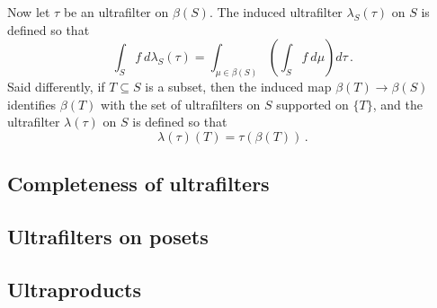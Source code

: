 \begin{construction}
	Now let $ \tau $ be an ultrafilter on $ \beta(S) $.
	The induced ultrafilter $ \lambda_S(\tau) $ on $ S $
	is defined so that
	\[
		\int_{S} f \ d\lambda_S(\tau) =
		\int_{\mu \in \beta(S)}
		\left( \int_{S} f \ d\mu \right) 
		d\tau \period
	\]
	Said differently, if $ T \subseteq S $ is a subset,
	then the induced map $ \beta(T) \to \beta(S) $
	identifies $ \beta(T) $ with
	the set of ultrafilters on $ S $ supported on $ \{T\} $, and
	the ultrafilter $ \lambda(\tau) $ on $ S $
	is defined so that  
	\[
		\lambda(\tau)(T) = \tau(\beta(T)) \period
	\]
\end{construction}

\subsection{Completeness of ultrafilters}%
\label{sub:completeness_of_ultrafilters}

\subsection{Ultrafilters on posets}%
\label{sub:ultrafilters_on_posets}

\subsection{Ultraproducts}%
\label{sub:ultraproducts}




